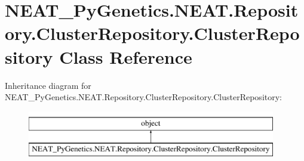 \hypertarget{class_n_e_a_t___py_genetics_1_1_n_e_a_t_1_1_repository_1_1_cluster_repository_1_1_cluster_repository}{}\section{N\+E\+A\+T\+\_\+\+Py\+Genetics.\+N\+E\+A\+T.\+Repository.\+Cluster\+Repository.\+Cluster\+Repository Class Reference}
\label{class_n_e_a_t___py_genetics_1_1_n_e_a_t_1_1_repository_1_1_cluster_repository_1_1_cluster_repository}
Inheritance diagram for N\+E\+A\+T\+\_\+\+Py\+Genetics.\+N\+E\+A\+T.\+Repository.\+Cluster\+Repository.\+Cluster\+Repository\+:\begin{figure}[H]
\begin{center}
\leavevmode
\includegraphics[height=2.000000cm]{class_n_e_a_t___py_genetics_1_1_n_e_a_t_1_1_repository_1_1_cluster_repository_1_1_cluster_repository}
\end{center}
\end{figure}
